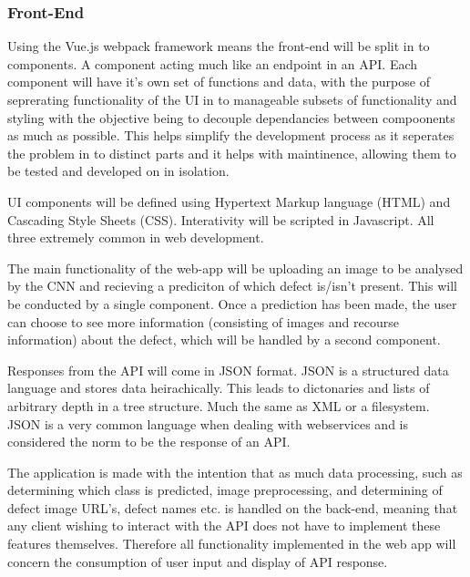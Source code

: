     \subsubsection{Front-End}
      Using the Vue.js webpack framework means the front-end will be split in to components. A component acting much like an endpoint in an API. Each component will have it's own set of functions and data, with the purpose of seprerating functionality of the UI in to manageable subsets of functionality and styling with the objective being to decouple dependancies between compoonents as much as possible. This helps simplify the development process as it seperates the problem in to distinct parts and it helps with maintinence, allowing them to be tested and developed on in isolation.
      \par
      UI components will be defined using Hypertext Markup language (HTML) and Cascading Style Sheets (CSS). Interativity will be scripted in Javascript. All three extremely common in web development. %
      \par
      The main functionality of the web-app will be uploading an image to be analysed by the CNN and recieving a prediciton of which defect is/isn't present. This will be conducted by a single component. Once a prediction has been made, the user can choose to see more information (consisting of images and recourse information) about the defect, which will be handled by a second component.
      \par
      Responses from the API will come in JSON format. JSON is a structured data language and stores data heirachically. This leads to dictonaries and lists of arbitrary depth in a tree structure. Much the same as XML or a filesystem. JSON is a very common language when dealing with webservices and is considered the norm to be the response of an API.
      \par
      The application is made with the intention that as much data processing, such as determining which class is predicted, image preprocessing, and determining of defect image URL's, defect names etc. is handled on the back-end, meaning that any client wishing to interact with the API does not have to implement these features themselves. Therefore all functionality implemented in the web app will concern the consumption of user input and display of API response.
      \par
